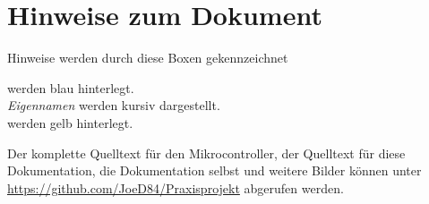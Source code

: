 \documentclass[
	11pt,					%
	DIV10,
	ngerman,					%
	a4paper,         		%
	twoside,				%
	titlepage,				%
	final					%
]{scrreprt}
\begin{document}
\setcounter{secnumdepth}{3}
\setcounter{tocdepth}{3}

\ofoot{}

%
\ofoot{\pagemark}

\tableofcontents								%

		
\label{sec:Glossar}		
\printnomenclature

\listoffigures						%
\listoftables						%
\renewcommand{\lstlistlistingname}{Codeverzeichnis}
\lstlistoflistings					%
\chapter*{Hinweise zum Dokument}
\begin{Tipp}Hinweise werden durch diese Boxen gekennzeichnet\end{Tipp}

 werden blau hinterlegt.\\

\emph{Eigennamen} werden kursiv dargestellt.\\

 werden gelb hinterlegt.\\

\lstset{language=C, basicstyle=\footnotesize, showstringspaces=false, tabsize=8}

Der komplette Quelltext für den Mikrocontroller, der Quelltext für diese Dokumentation, die Dokumentation selbst und weitere Bilder können unter \url{https://github.com/JoeD84/Praxisprojekt} abgerufen werden.
\clearpage
{}
\end{document}
